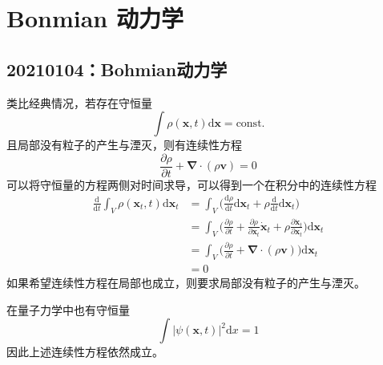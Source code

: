 \chapter{Bonmian 动力学}
    \section{20210104：Bohmian动力学}

        类比经典情况，若存在守恒量
        \begin{equation*}
            \int \rho (\bm{x},t) \mathrm{d} \bm{x} = \text{const.}
        \end{equation*}
        且局部没有粒子的产生与湮灭，则有连续性方程
        \begin{equation*}
            \frac {\partial \rho}{\partial t} + \bm{\nabla} \cdot (\rho \bm{v}) = 0
        \end{equation*}
        可以将守恒量的方程两侧对时间求导，可以得到一个在积分中的连续性方程
        \begin{align*}
            \frac{\mathrm{d}}{\mathrm{d}t} \int_V \rho (\bm{x}_t, t) \mathrm{d} \bm{x}_t
            & = \int_V \bigg( \frac{\mathrm{d}\rho}{\mathrm{d}t} \mathrm{d} \bm{x}_t + \rho \frac{\mathrm{d}}{\mathrm{d}t} \mathrm{d} \bm{x}_t\bigg) \\
            & = \int_V \bigg( \frac{\partial \rho}{\partial t} + \frac{\partial \rho}{\partial \bm{x}_t}\bm{\dot{x}}_t + \rho \frac{\partial \bm{\dot{x}}_t}{\partial \bm{x}_t} \bigg) \mathrm{d} \bm{x}_t \\
            & = \int_V \bigg( \frac {\partial \rho}{\partial t} + \bm{\nabla} \cdot (\rho \bm{v}) \bigg) \mathrm{d} \bm{x}_t \\
            & = 0 
        \end{align*}
        如果希望连续性方程在局部也成立，则要求局部没有粒子的产生与湮灭。

        在量子力学中也有守恒量
        \begin{equation*}
            \int |\psi(\bm{x},t)|^2 \mathrm{d}x = 1
        \end{equation*}
        因此上述连续性方程依然成立。

